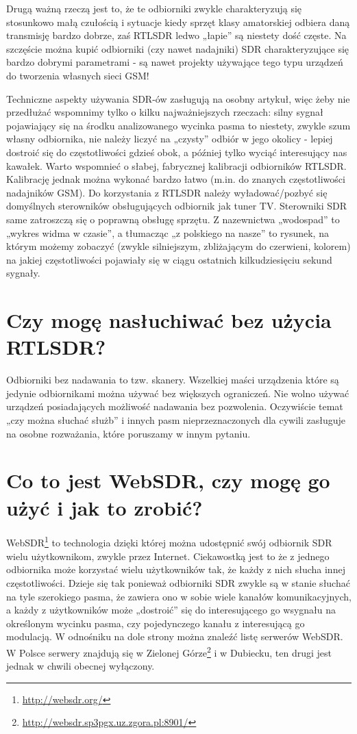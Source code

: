 \documentclass[a4paper,12pt]{article}
\begin{document}
Drugą ważną rzeczą jest to, że te odbiorniki zwykle charakteryzują się stosunkowo małą czułością i sytuacje kiedy sprzęt klasy amatorskiej odbiera daną transmisję bardzo dobrze, zaś RTLSDR ledwo „łapie” są niestety dość częste. Na szczęście można kupić odbiorniki (czy nawet nadajniki) SDR charakteryzujące się bardzo dobrymi parametrami - są nawet projekty używające tego typu urządzeń do tworzenia własnych sieci GSM!

Techniczne aspekty używania SDR-ów zasługują na osobny artykuł, więc żeby nie przedłużać wspomnimy tylko o kilku najważniejszych rzeczach: silny sygnał pojawiający się na środku analizowanego wycinka pasma to niestety, zwykle szum własny odbiornika, nie należy liczyć na „czysty” odbiór w jego okolicy - lepiej dostroić się do częstotliwości gdzieś obok, a później tylko wyciąć interesujący nas kawałek. Warto wspomnieć o słabej, fabrycznej kalibracji odbiorników RTLSDR. Kalibrację jednak można wykonać bardzo łatwo (m.in. do znanych częstotliwości nadajników GSM). Do korzystania z RTLSDR należy wyładować/pozbyć się domyślnych sterowników obsługujących odbiornik jak tuner TV. Sterowniki SDR same zatroszczą się o poprawną obsługę sprzętu.
Z nazewnictwa „wodospad” to „wykres widma w czasie”, a tłumacząc „z polskiego na nasze” to rysunek, na którym możemy zobaczyć (zwykle silniejszym, zbliżającym do czerwieni, kolorem) na jakiej częstotliwości pojawiały się w ciągu ostatnich kilkudziesięciu sekund sygnały.

\section{Czy mogę nasłuchiwać bez użycia RTLSDR?}
Odbiorniki bez nadawania to tzw. skanery. Wszelkiej maści urządzenia które są jedynie odbiornikami można używać bez większych ograniczeń. Nie wolno używać urządzeń posiadających możliwość nadawania bez pozwolenia. Oczywiście temat „czy można słuchać służb” i innych pasm nieprzeznaczonych dla cywili zasługuje na osobne rozważania, które poruszamy w innym pytaniu.

\section{Co to jest WebSDR, czy mogę go użyć i jak to zrobić?}
WebSDR\footnote{\url{http://websdr.org/}} to technologia dzięki której można udostępnić swój odbiornik SDR wielu użytkownikom, zwykle przez Internet. Ciekawostką jest to że z jednego odbiornika może korzystać wielu użytkowników tak, że każdy z nich słucha innej częstotliwości. Dzieje się tak ponieważ odbiorniki SDR zwykle są w stanie słuchać na tyle szerokiego pasma, że zawiera ono w sobie wiele kanałów komunikacyjnych, a każdy z użytkowników może „dostroić” się do interesującego go wsygnału na określonym wycinku pasma, czy pojedynczego kanału z interesującą go modulacją. W odnośniku na dole strony można znaleźć listę serwerów WebSDR. W Polsce serwery znajdują się w Zielonej Górze\footnote{\url{http://websdr.sp3pgx.uz.zgora.pl:8901/}} i w Dubiecku, ten drugi jest jednak w chwili obecnej wyłączony.
\end{document}
